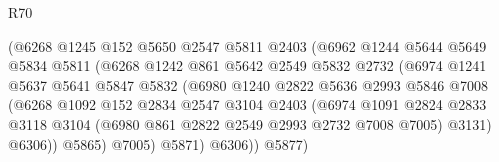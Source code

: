 \begin{lexlean}{R70}
\begin{coremodule}
                                  (@6268
                                    @1245
                                    @152
                                    @5650
                                    @2547
                                    @5811
                                    @2403
                                    (@6962
                                      @1244
                                      @5644
                                      @5649
                                      @5834
                                      @5811
                                      (@6268
                                        @1242
                                        @861
                                        @5642
                                        @2549
                                        @5832
                                        @2732
                                        (@6974
                                          @1241
                                          @5637
                                          @5641
                                          @5847
                                          @5832
                                          (@6980
                                            @1240
                                            @2822
                                            @5636
                                            @2993
                                            @5846
                                            @7008
                                            (@6268
                                              @1092
                                              @152
                                              @2834
                                              @2547
                                              @3104
                                              @2403
                                              (@6974
                                                @1091
                                                @2824
                                                @2833
                                                @3118
                                                @3104
                                                (@6980 @861 @2822 @2549 @2993 @2732 @7008 @7005)
                                                @3131)
                                              @6306))
                                          @5865)
                                        @7005)
                                      @5871)
                                    @6306))
                                @5877)

\end{coremodule}
\end{lexlean}
